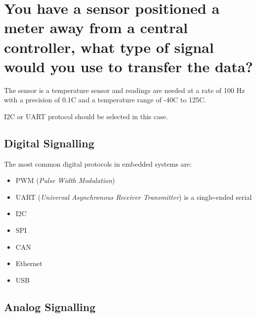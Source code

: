 \documentclass[main.tex]{subfiles}
\begin{document}
\section{You have a sensor positioned a meter away from a central controller, what type of signal would you use to transfer the data?}
The sensor is a temperature sensor and readings are needed at a rate of 100 Hz with a precision of 0.1C and a temperature range of -40C to 125C.

\spoilerline

\noindent I2C or UART protocol should be selected in this case. 

\subsection{Digital Signalling}



The most common digital protocols in embedded systems are:
\begin{itemize}
    \item PWM (\textit{Pulse Width Modulation})
    \item UART (\textit{Universal Asynchronous Receiver Transmitter}) is a single-ended serial
    \item I2C
    \item SPI
    \item CAN
    \item Ethernet
    \item USB
\end{itemize}

\subsection{Analog Signalling}
\end{document}
